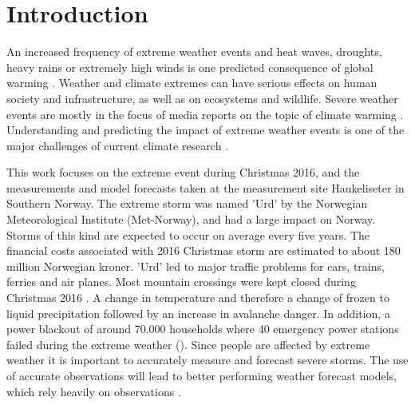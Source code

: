\chapter{Introduction}
\label{ch:intro}
An increased frequency of extreme weather events and heat waves, droughts, heavy rains or extremely high winds is one predicted consequence of global warming \citep{hansen_warmer_2014}. Weather and climate extremes can have serious effects on human society and infrastructure, as well as on ecosystems and wildlife. Severe weather events are mostly in the focus of media reports on the topic of climate warming \citep{meehl_introduction_2000}. Understanding and predicting the impact of extreme weather events is one of the major challenges of current climate research \citep{stocker_working_2013,field_summary_2014}.
\par\medskip
\noindent
This work focuses on the extreme event during Christmas 2016, and the measurements and model forecasts taken at the measurement site Haukeliseter in Southern Norway. The extreme storm was named 'Urd' by the Norwegian Meteorological Institute (Met-Norway), and had a large impact on Norway. Storms of this kind are expected to occur on average every five years. The financial costs associated with 2016 Christmas storm are estimated to about 180 million Norwegian kroner. 'Urd' led to major traffic problems for cars, trains, ferries and air planes. Most mountain crossings were kept closed during Christmas 2016 \citep{olsen_ekstremvaerrapport._2017}. A change in temperature and therefore a change of frozen to liquid precipitation followed by an increase in avalanche danger. In addition, a power blackout of around 70.000 households where 40 emergency power stations failed during the extreme weather (). Since people are affected by extreme weather it is important to accurately measure and forecast severe storms. The use of accurate observations will lead to better performing weather forecast models, which rely heavily on observations \citep{joos_influence_2012}. 

\par\medskip
\noindent
